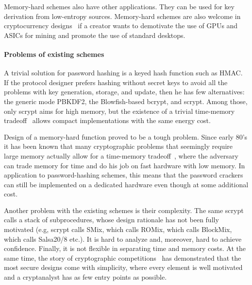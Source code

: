 \documentclass[a4paper]{article}
\begin{document}
Memory-hard schemes also have other applications. They can be used for key derivation from low-entropy sources. Memory-hard schemes are also welcome in cryptocurrency designs~\cite{litecoin} if a creator wants to demotivate the use of GPUs and ASICs for mining and promote the use of standard desktops.

\paragraph{Problems of existing schemes} A trivial solution for password hashing is a keyed hash function such as HMAC. If the protocol designer prefers hashing without secret keys to avoid all the problems with key generation, storage, and update, then he has few alternatives: the generic mode PBKDF2, the Blowfish-based \textsf{bcrypt}, and \textsf{scrypt}. Among those, only 
\textsf{scrypt} aims for high memory, but the existence of a trivial time-memory tradeoff~\cite{ForlerLW14} allows compact implementations with the same energy cost.

Design of a memory-hard function proved to be a tough problem. Since early 80's it has been known that many cryptographic problems that seemingly require large memory actually allow for a time-memory tradeoff~\cite{hellman1980cryptanalytic}, where the adversary can trade memory for time and do his job on fast hardware with low memory. In application
to password-hashing schemes, this means that the password crackers can still be implemented on a dedicated hardware even though at some additional cost. 

Another problem with the existing schemes is their complexity. The same \textsf{scrypt} calls a stack of subprocedures, whose design rationale has not been fully motivated (e.g, \textsf{scrypt} calls SMix, which calls ROMix, which calls BlockMix, which calls Salsa20/8 etc.).  It is hard to analyze and, moreover, hard to achieve confidence. Finally, it is not flexible in separating time and memory costs. 
At the same time, the story of cryptographic competitions~\cite{robshaw2008new,sha3} has demonstrated that
the most secure designs come with simplicity, where every element is well motivated and a cryptanalyst has as few entry points as possible.
\end{document}
